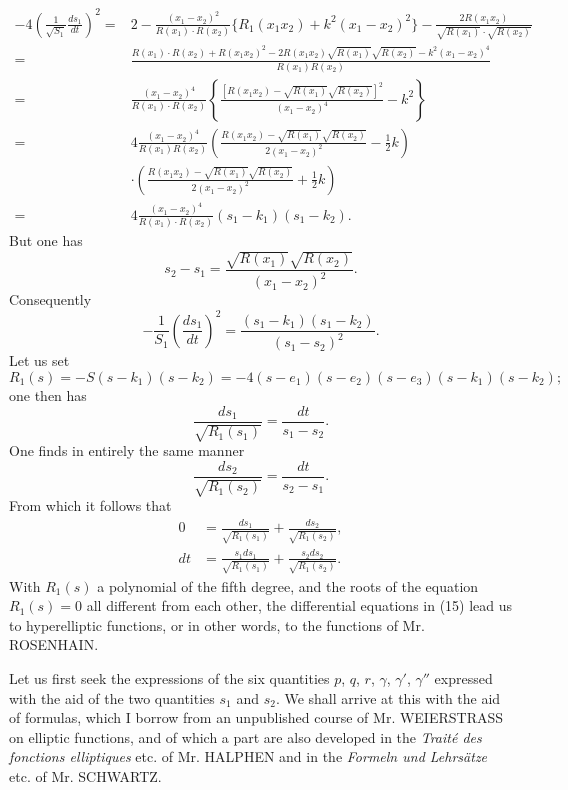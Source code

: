 \documentclass{article}
\begin{document}
\begin{align*}
-4\left(\frac{1}{\sqrt{S_1}}\frac{ds_1}{dt}\right)^2 =& 2 - \frac{(x_1 - x_2)^2}{R(x_1)\cdot R(x_2)}\{R_1(x_1x_2) + k^2(x_1 - x_2)^2\} - \frac{2R(x_1x_2)}{\sqrt{R(x_1)}\cdot\sqrt{R(x_2)}} \\
=& \frac{R(x_1)\cdot R(x_2) + R(x_1x_2)^2 - 2R(x_1x_2)\sqrt{R(x_1)}\sqrt{R(x_2)} - k^2(x_1 - x_2)^4}{R(x_1)R(x_2)} \\
=& \frac{(x_1 - x_2)^4}{R(x_1)\cdot R(x_2)}\left\{\frac{\left[R(x_1x_2) - \sqrt{R(x_1)}\sqrt{R(x_2)}\right]^2}{(x_1 - x_2)^4} - k^2\right\} \\
=& 4\frac{(x_1 - x_2)^4}{R(x_1)R(x_2)}\left(\frac{R(x_1x_2) - \sqrt{R(x_1)}\sqrt{R(x_2)}}{2(x_1 - x_2)^2} - \frac{1}{2}k\right) \\
&\cdot\left(\frac{R(x_1x_2) - \sqrt{R(x_1)}\sqrt{R(x_2)}}{2(x_1 - x_2)^2} + \frac{1}{2}k\right) \\
=& 4\frac{(x_1 - x_2)^4}{R(x_1)\cdot R(x_2)}(s_1 - k_1)(s_1 - k_2).
\end{align*}
But one has
\[
s_2 - s_1 = \frac{\sqrt{R(x_1)}\sqrt{R(x_2)}}{(x_1 - x_2)^2}.
\]
Consequently
\[
-\frac{1}{S_1}\left(\frac{ds_1}{dt}\right)^2 = \frac{(s_1 - k_1)(s_1 - k_2)}{(s_1 - s_2)^2}.
\]
Let us set
\[
R_1(s) = -S(s - k_1)(s - k_2) = -4(s - e_1)(s - e_2)(s - e_3)(s - k_1)(s - k_2);
\]
one then has
\[
\frac{ds_1}{\sqrt{R_1(s_1)}} = \frac{dt}{s_1 - s_2}.
\]
One finds in entirely the same manner
\[
\frac{ds_2}{\sqrt{R_1(s_2)}} = \frac{dt}{s_2 - s_1}.
\]
From which it follows that
\begin{equation}
\begin{aligned}
0 &= \frac{ds_1}{\sqrt{R_1(s_1)}} + \frac{ds_2}{\sqrt{R_1(s_2)}}, \\
dt &= \frac{s_1ds_1}{\sqrt{R_1(s_1)}} + \frac{s_2ds_2}{\sqrt{R_1(s_2)}}.
\end{aligned}
\end{equation}
With $R_1(s)$ a polynomial of the fifth degree, and the roots of the equation $R_1(s) = 0$ all different from each other, the differential equations in (15) lead us to hyperelliptic functions, or in other words, to the functions of Mr. ROSENHAIN.

Let us first seek the expressions of the six quantities $p$, $q$, $r$, $\gamma$, $\gamma'$, $\gamma''$ expressed with the aid of the two quantities $s_1$ and $s_2$. 
We shall arrive at this with the aid of formulas, which I borrow from an unpublished course of Mr. WEIERSTRASS on elliptic functions, and of which a part are also developed in the \textit{Traité des fonctions elliptiques} etc. of Mr. HALPHEN and in the \textit{Formeln und Lehrsätze} etc. of Mr. SCHWARTZ.
\end{document}
